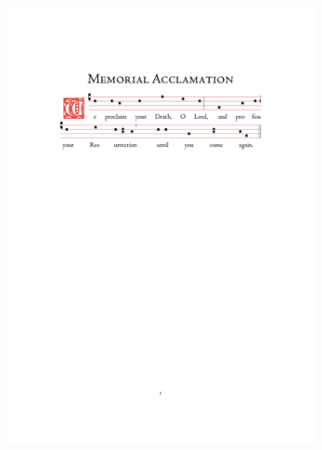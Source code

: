 \documentclass[10pt,a5]{article}
\begin{document}
\begin{figure}[h]
	\centering
	\includegraphics[trim = 35mm 195mm 35.5mm 45mm, clip, width = 0.8\textwidth]{scores/Memorial-Acclamation.pdf}
\end{figure}



%
\end{document}
